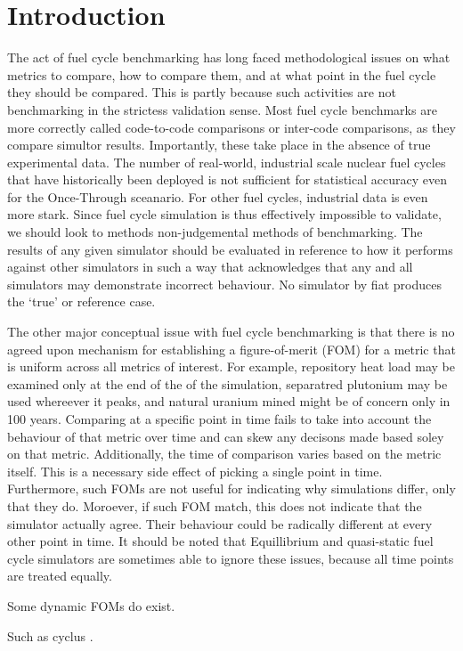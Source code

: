 \section{Introduction}
\label{intro}
The act of fuel cycle benchmarking has long faced methodological issues 
on what metrics to compare, how to compare them, and at what point in the
fuel cycle they should be compared. This is partly because such activities 
are not benchmarking in the strictess validation sense. Most fuel
cycle benchmarks are more correctly called code-to-code comparisons or 
inter-code comparisons, as they compare simultor results. Importantly, 
these take place in the absence of true experimental data. The number of 
real-world, industrial scale nuclear fuel cycles that have historically been 
deployed is not sufficient for statistical accuracy even for the Once-Through 
sceanario. For other fuel cycles, industrial data is even more stark. 
Since fuel cycle simulation is thus effectively impossible to validate, 
we should look to methods non-judgemental methods of benchmarking. The 
results of any given simulator should be evaluated in reference to how 
it performs against other simulators in such a way that acknowledges that 
any and all simulators may demonstrate incorrect behaviour. No simulator
by fiat produces the `true' or reference case.

The other major conceptual issue with fuel cycle benchmarking is that there 
is no agreed upon mechanism for establishing a figure-of-merit (FOM) for 
a metric that is uniform across all metrics of interest. For example, 
repository heat load may be examined only at the end of the of the simulation,
separatred plutonium may be used whereever it peaks, and natural uranium 
mined might be of concern only in 100 years. Comparing at a specific point 
in time fails to take into account the behaviour of that metric over time and 
can skew any decisons made based soley on that metric. Additionally, the 
time of comparison varies based on the metric itself. This is a necessary 
side effect of picking a single point in time.
Furthermore, such FOMs are not useful for indicating why simulations differ, 
only that they do. Moroever, if such FOM match, this does not indicate
that the simulator actually agree. Their behaviour could be radically 
different at every other point in time.  It should be noted that 
Equillibrium and quasi-static fuel cycle simulators are sometimes able to 
ignore these issues, because all time points are treated equally.

Some dynamic FOMs do exist. 



Such as cyclus \cite{cyclus_v1_2}.